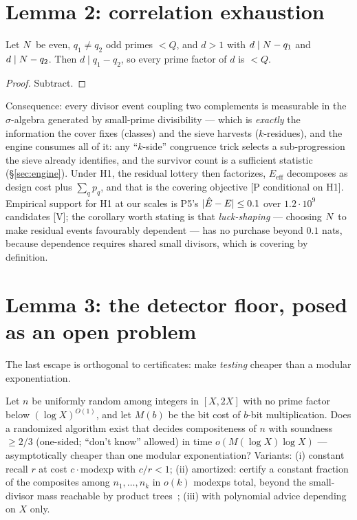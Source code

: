 \section{Lemma 2: correlation exhaustion}\label{sec:lemma2}

\begin{proposition}\label{prop:shared}
Let $N$ be even, $q_1\ne q_2$ odd primes $<Q$, and $d>1$ with
$d\mid N-q_1$ and $d\mid N-q_2$. Then $d\mid q_1-q_2$, so every prime
factor of $d$ is $<Q$.
\end{proposition}
\begin{proof}
Subtract.
\end{proof}

Consequence: every divisor event coupling two complements is measurable
in the $\sigma$-algebra generated by small-prime divisibility --- which
is \emph{exactly} the information the cover fixes (classes) and the
sieve harvests ($k$-residues), and the engine consumes all of it: any
``$k$-side'' congruence trick selects a sub-progression the sieve
already identifies, and the survivor count is a sufficient statistic
(\S\ref{sec:engine}). Under H1, the residual lottery then factorizes,
$E_{\mathrm{eff}}$ decomposes as design cost plus $\sum_qp_q$, and that
is the covering objective [P conditional on H1]. Empirical support for
H1 at our scales is P5's $|\hat{E}-E|\le0.1$ over $1.2\cdot10^9$
candidates [V]; the corollary worth stating is that
\emph{luck-shaping} --- choosing $N$ to make residual events
favourably dependent --- has no purchase beyond $0.1$ nats, because
dependence requires shared small divisors, which is covering by
definition.

\section{Lemma 3: the detector floor, posed as an open problem}\label{sec:lemma3}

The last escape is orthogonal to certificates: make \emph{testing}
cheaper than a modular exponentiation.

\begin{openproblem}
\label{op:H2}
Let $n$ be uniformly random among integers in $[X,2X]$ with no prime
factor below $(\log X)^{O(1)}$, and let $M(b)$ be the bit cost of
$b$-bit multiplication. Does a randomized algorithm exist that decides
compositeness of $n$ with soundness $\ge2/3$ (one-sided; ``don't
know'' allowed) in time $o(M(\log X)\log X)$ --- asymptotically cheaper
than one modular exponentiation? Variants: (i) constant recall $r$ at
cost $c\cdot$modexp with $c/r<1$; (ii) amortized: certify a constant
fraction of the composites among $n_1,\dots,n_k$ in $o(k)$ modexps
total, beyond the small-divisor mass reachable by product
trees~\cite{Bernstein}; (iii) with polynomial advice depending on $X$
only.
\end{openproblem}

